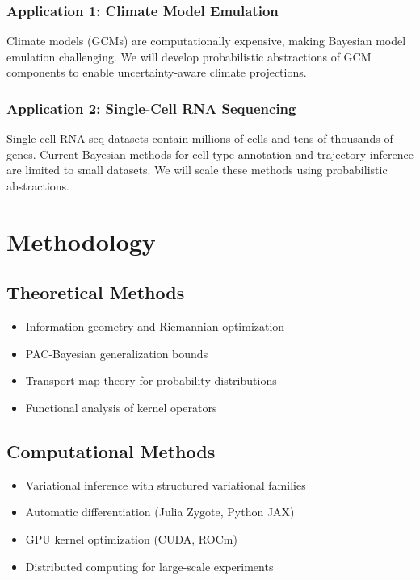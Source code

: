 \documentclass[
    language=english,
    doctype=dissertation-proposal,
    institution=none,
]{../../omnilatex}
\begin{document}
\subsubsection{Application 1: Climate Model Emulation}

Climate models (GCMs) are computationally expensive, making Bayesian model
emulation challenging. We will develop probabilistic abstractions of GCM
components to enable uncertainty-aware climate projections.

\subsubsection{Application 2: Single-Cell RNA Sequencing}

Single-cell RNA-seq datasets contain millions of cells and tens of thousands
of genes. Current Bayesian methods for cell-type annotation and trajectory
inference are limited to small datasets. We will scale these methods using
probabilistic abstractions.

\section{Methodology}
\label{sec:methodology}

\subsection{Theoretical Methods}

\begin{itemize}
    \item Information geometry and Riemannian optimization
    \item PAC-Bayesian generalization bounds
    \item Transport map theory for probability distributions
    \item Functional analysis of kernel operators
\end{itemize}

\subsection{Computational Methods}

\begin{itemize}
    \item Variational inference with structured variational families
    \item Automatic differentiation (Julia Zygote, Python JAX)
    \item GPU kernel optimization (CUDA, ROCm)
    \item Distributed computing for large-scale experiments
\end{itemize}
\end{document}

